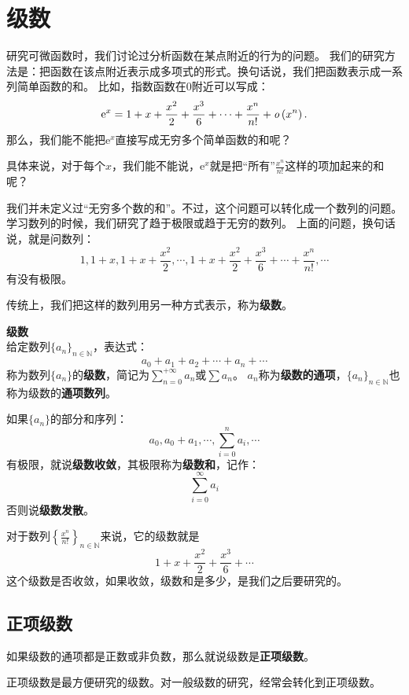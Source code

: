 \documentclass[12pt,UTF8,fontset=none]{ctexbook}
\begin{document}
\chapter{级数}
研究可微函数时，我们讨论过分析函数在某点附近的行为的问题。
我们的研究方法是：把函数在该点附近表示成多项式的形式。换句话说，我们把函数表示成一系列简单函数的和。
比如，指数函数在$0$附近可以写成：
$$\mathrm{e}^x = 1 + x + \frac{x^2}{2} + \frac{x^3}{6} + \cdots + \frac{x^n}{n!} + \mathit{o}\left(x^n\right).$$
那么，我们能不能把$\mathrm{e}^x$直接写成无穷多个简单函数的和呢？

具体来说，对于每个$x$，我们能不能说，$\mathrm{e}^x$就是把“所有”$\frac{x^n}{n!}$这样的项加起来的和呢？

我们并未定义过“无穷多个数的和”。不过，这个问题可以转化成一个数列的问题。
学习数列的时候，我们研究了趋于极限或趋于无穷的数列。
上面的问题，换句话说，就是问数列：
$$ 1, 1+x, 1+x + \frac{x^2}{2}, \cdots , 1 + x + \frac{x^2}{2} + \frac{x^3}{6} + \cdots + \frac{x^n}{n!}, \cdots $$
有没有极限。

传统上，我们把这样的数列用另一种方式表示，称为\textbf{级数}。

\begin{df}{\textbf{级数}}
    \mbox{} \\
    给定数列$\{a_n\}_{n\in\mathbb{N}}$，表达式：
    $$ a_0 + a_1 + a_2 + \cdots + a_n + \cdots $$
    称为数列$\{a_n\}$的\textbf{级数}，简记为$\sum_{n=0}^{+\infty} a_n$或$\sum a_n$。
    $a_n$称为\textbf{级数的通项}，$\{a_n\}_{n\in\mathbb{N}}$也称为级数的\textbf{通项数列}。
    
    如果$\{a_n\}$的部分和序列：
    $$ a_0, a_0 + a_1, \cdots , \sum_{i=0}^n a_i, \cdots $$
    有极限，就说\textbf{级数收敛}，其极限称为\textbf{级数和}，记作：
    $$ \sum_{i=0}^\infty a_i $$
    否则说\textbf{级数发散}。
    
\end{df}

对于数列$\left\{\frac{x^n}{n!}\right\}_{n\in\mathbb{N}}$来说，它的级数就是
$$ 1 + x + \frac{x^2}{2} + \frac{x^3}{6} + \cdots $$
这个级数是否收敛，如果收敛，级数和是多少，是我们之后要研究的。

\section{正项级数}

如果级数的通项都是正数或非负数，那么就说级数是\textbf{正项级数}。

正项级数是最方便研究的级数。对一般级数的研究，经常会转化到正项级数。
\end{document}
